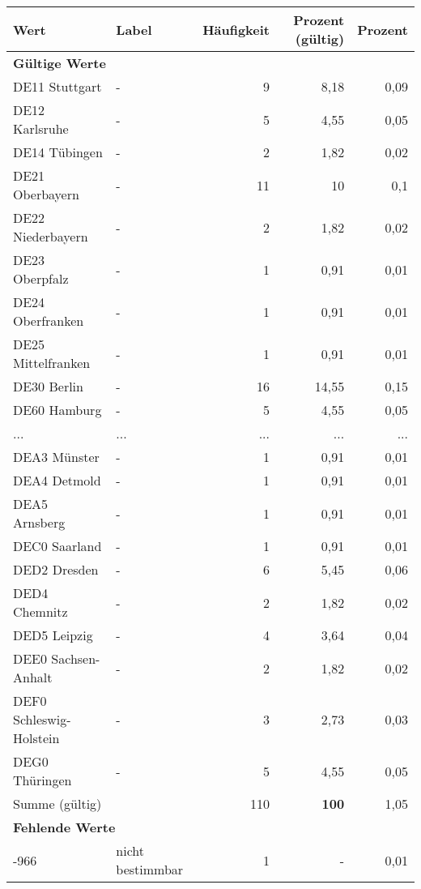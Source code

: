      \begin{longtable}{Xlrrr}
     \toprule
     \textbf{Wert} & \textbf{Label} & \textbf{Häufigkeit} & \textbf{Prozent (gültig)} & \textbf{Prozent} \\
     \endhead
     \midrule
     \multicolumn{5}{l}{\textbf{Gültige Werte}}\\
        \multicolumn{1}{X}{DE11 Stuttgart} & - & 9 & 8,18 & 0,09 \\
        \multicolumn{1}{X}{DE12 Karlsruhe} & - & 5 & 4,55 & 0,05 \\
        \multicolumn{1}{X}{DE14 Tübingen} & - & 2 & 1,82 & 0,02 \\
        \multicolumn{1}{X}{DE21 Oberbayern} & - & 11 & 10 & 0,1 \\
        \multicolumn{1}{X}{DE22 Niederbayern} & - & 2 & 1,82 & 0,02 \\
        \multicolumn{1}{X}{DE23 Oberpfalz} & - & 1 & 0,91 & 0,01 \\
        \multicolumn{1}{X}{DE24 Oberfranken} & - & 1 & 0,91 & 0,01 \\
        \multicolumn{1}{X}{DE25 Mittelfranken} & - & 1 & 0,91 & 0,01 \\
        \multicolumn{1}{X}{DE30 Berlin} & - & 16 & 14,55 & 0,15 \\
        \multicolumn{1}{X}{DE60 Hamburg} & - & 5 & 4,55 & 0,05 \\
       ... & ... & ... & ... & ... \\
        \multicolumn{1}{X}{DEA3 Münster} & - & 1 & 0,91 & 0,01 \\
        \multicolumn{1}{X}{DEA4 Detmold} & - & 1 & 0,91 & 0,01 \\
        \multicolumn{1}{X}{DEA5 Arnsberg} & - & 1 & 0,91 & 0,01 \\
        \multicolumn{1}{X}{DEC0 Saarland} & - & 1 & 0,91 & 0,01 \\
        \multicolumn{1}{X}{DED2 Dresden} & - & 6 & 5,45 & 0,06 \\
        \multicolumn{1}{X}{DED4 Chemnitz} & - & 2 & 1,82 & 0,02 \\
        \multicolumn{1}{X}{DED5 Leipzig} & - & 4 & 3,64 & 0,04 \\
        \multicolumn{1}{X}{DEE0 Sachsen-Anhalt} & - & 2 & 1,82 & 0,02 \\
        \multicolumn{1}{X}{DEF0 Schleswig-Holstein} & - & 3 & 2,73 & 0,03 \\
        \multicolumn{1}{X}{DEG0 Thüringen} & - & 5 & 4,55 & 0,05 \\
     \midrule
      \multicolumn{2}{l}{Summe (gültig)} & 110 &
      \textbf{100} &
         1,05 \\
     \multicolumn{5}{l}{\textbf{Fehlende Werte}}\\
       -966 & nicht bestimmbar & 1 & - & 0,01 \\


\end{longtable}
